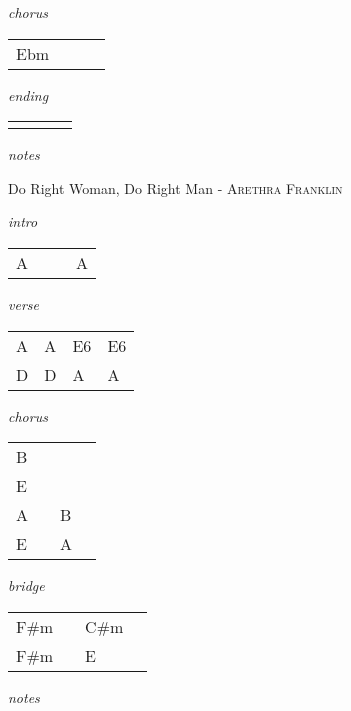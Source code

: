 \documentclass[12pt]{article}
\begin{document}
\textit{chorus}

\begin{tabular}{|P{1.25in}|P{1.25in}|P{1.25in}|P{1.25in}|}
  Ebm &   &   &   \\
\end{tabular}

\textit{ending}

\begin{tabular}{|P{1.25in}|P{1.25in}|P{1.25in}|P{1.25in}|}
   &   &   &   \\
\end{tabular}

\textit{notes}

\newpage

{\Huge Do Right Woman, Do Right Man} {\huge - \textsc{Arethra Franklin}}

\huge
\textit{intro}

\begin{tabular}{|P{1.25in}|P{1.25in}|P{1.25in}|P{1.25in}|}
  A &   &   &  A \\

\end{tabular}

\textit{verse}

\begin{tabular}{|P{1.25in}|P{1.25in}|P{1.25in}|P{1.25in}|}
  A & A  &  E6 &  E6 \\
  D & D  &  A &  A \\
\end{tabular}

\textit{chorus}

\begin{tabular}{|P{1.25in}|P{1.25in}|P{1.25in}|P{1.25in}|}
  B &   &   &   \\
  E &   &   &   \\
\hline
  A &   &  B &  \\
  E &   &  A &   \\
\end{tabular}

\textit{bridge}

\begin{tabular}{|P{1.25in}|P{1.25in}|P{1.25in}|P{1.25in}|}
  F\#m &   & C\#m  &   \\
  F\#m &   &  E    & \\
\end{tabular}

\textit{notes}
  

\newpage
\end{document}
